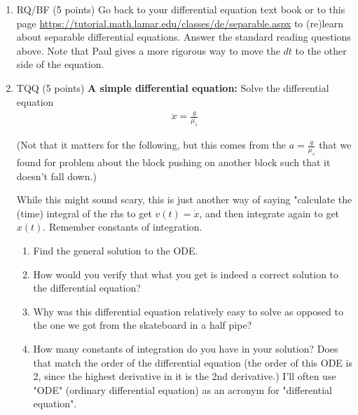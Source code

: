\documentclass[12pt]{article}
\begin{document}
\begin{enumerate}
  \item RQ/BF (5 points)  Go back to your differential equation text book or to this page
  \url{https://tutorial.math.lamar.edu/classes/de/separable.aspx} to (re)learn about separable differential equations.  Answer the standard reading questions above.  Note that Paul gives a more rigorous way to move the $dt$ to the other side of the equation.

  \item TQQ (5 points) \textbf{A simple differential equation:} Solve the differential equation
  \begin{align}
      \ddot x = \frac{g}{\mu_s}
  \end{align}

  (Not that it matters for the following, but this comes from the $a = \frac{g}{\mu_s}$ that we found for problem about the block pushing on another block such that it doesn't fall down.)

  While this might sound scary, this is just another way of saying "calculate the (time) integral of the rhs to get $v(t) = \dot x$, and then integrate again to get $x(t)$. Remember constants of integration.

  \begin{enumerate}
    \item Find the general solution to the ODE.
      \item How would you verify that what you get is indeed a correct solution to the differential equation?
      \item Why was this differential equation relatively easy to solve as opposed to the one we got from the skateboard in a half pipe?
      \item How many constants of integration do you have in your solution? Does that match the order of the differential equation (the order of this ODE is 2, since the highest derivative in it is the 2nd derivative.) I'll often use "ODE" (ordinary differential equation) as an acronym for "differential equation".
  \end{enumerate}

  \soln{

}
\end{enumerate}
\end{document}
